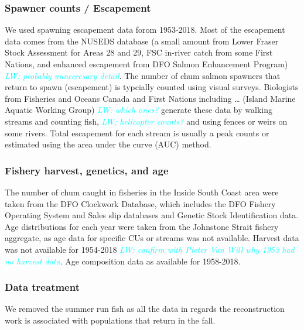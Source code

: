 \documentclass[11pt]{book}
\begin{document}
\hypertarget{spawner-counts-escapement}{%
\subsubsection{Spawner counts / Escapement}\label{spawner-counts-escapement}}

We used spawning escapement data forom 1953-2018. Most of the escapement data comes from the NUSEDS database (a small amount from Lower Fraser Stock Assessment for Areas 28 and 29, FSC in-river catch from some First Nations, and enhanced escapement from DFO Salmon Enhancement Program) \emph{\textcolor{cyan}{LW: probably unneccesary detail}}. The number of chum salmon spawners that return to spawn (escapement) is typcially counted using visual surveys. Biologists from Fisheries and Oceans Canada and First Nations including \ldots{} (Island Marine Aquatic Working Group) \emph{\textcolor{cyan}{LW: which ones?}} generate these data by walking streams and counting fish, \emph{\textcolor{cyan}{LW: helicopter counts?}} and using fences or weirs on some rivers. Total escapement for each stream is usually a peak counts or estimated using the area under the curve (AUC) method.

\hypertarget{fishery-harvest-genetics-and-age}{%
\subsubsection{Fishery harvest, genetics, and age}\label{fishery-harvest-genetics-and-age}}

The number of chum caught in fisheries in the Inside South Coast area were taken from the DFO Clockwork Database, which includes the DFO Fishery Operating System and Sales slip databases and Genetic Stock Identification data. Age distributions for each year were taken from the Johnstone Strait fishery aggregate, as age data for specific CUs or streams was not available. Harvest data was not available for 1954-2018 \emph{\textcolor{cyan}{LW: confirm with Pieter Van Will why 1953 had no harvest data}}. Age composition data as available for 1958-2018.

\hypertarget{data-treatment}{%
\subsubsection{Data treatment}\label{data-treatment}}

We removed the summer run fish as all the data in regards the reconstruction work is associated with populations that return in the fall.
\end{document}
